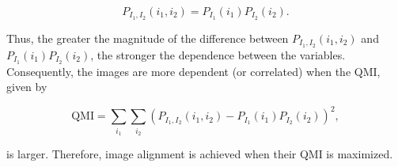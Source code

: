 \documentclass[11pt]{article}
\begin{document}
\begin{enumerate}
\begin{enumerate}
\[
P_{I_1, I_2}(i_1, i_2) = P_{I_1}(i_1) P_{I_2}(i_2).
\]

Thus, the greater the magnitude of the difference between \( P_{I_1, I_2}(i_1, i_2) \) and \( P_{I_1}(i_1) P_{I_2}(i_2) \), the stronger the dependence between the variables. Consequently, the images are more dependent (or correlated) when the QMI, given by

\[
\text{QMI} = \sum_{i_1} \sum_{i_2} \left( P_{I_1, I_2}(i_1, i_2) - P_{I_1}(i_1) P_{I_2}(i_2) \right)^2,
\]

is larger. Therefore, image alignment is achieved when their QMI is maximized.

\end{enumerate}
\end{enumerate}
\end{document}
